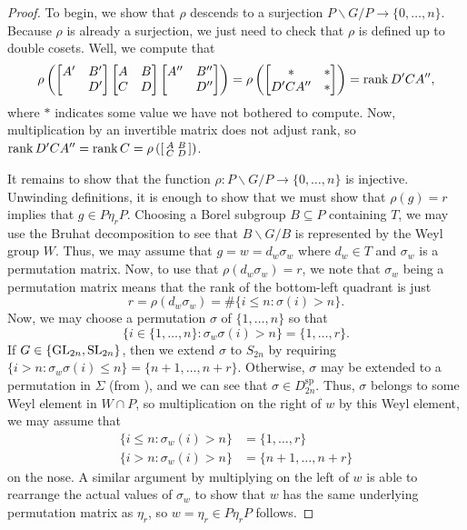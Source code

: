 \begin{proof}
    To begin, we show that $\rho$ descends to a surjection $P\backslash G/P\to\{0,\ldots,n\}$. Because $\rho$ is already a surjection, we just need to check that $\rho$ is defined up to double cosets. Well, we compute that
    \[\rho\left(\begin{bmatrix}
        A' & B' \\ & D'
    \end{bmatrix}\begin{bmatrix}
        A & B \\ C & D
    \end{bmatrix}\begin{bmatrix}
        A'' & B'' \\ & D''
    \end{bmatrix}\right)=\rho\left(\begin{bmatrix}
        * & * \\
        D'CA'' & *
    \end{bmatrix}\right)=\operatorname{rank}D'CA'',\]
    where $*$ indicates some value we have not bothered to compute. Now, multiplication by an invertible matrix does not adjust rank, so $\operatorname{rank}D'CA''=\operatorname{rank}C=\rho\left(\begin{bsmallmatrix}
        A & B \\ C & D
    \end{bsmallmatrix}\right)$.

    It remains to show that the function $\rho\colon P\backslash G/P\to\{0,
    \ldots,n\}$ is injective. Unwinding definitions, it is enough to show that we must show that $\rho(g)=r$ implies that $g\in P\eta_rP$. Choosing a Borel subgroup $B\subseteq P$ containing $T$, we may use the Bruhat decomposition to see that $B\backslash G/B$ is represented by the Weyl group $W$. Thus, we may assume that $g=w=d_w\sigma_w$ where $d_w\in T$ and $\sigma_w$ is a permutation matrix. Now, to use that $\rho(d_w\sigma_w)=r$, we note that $\sigma_w$ being a permutation matrix means that the rank of the bottom-left quadrant is just
    \[r=\rho(d_w\sigma_w)=\#\{i\le n:\sigma(i)>n\}.\]
    Now, we may choose a permutation $\sigma$ of $\{1,\ldots,n\}$ so that
    \[\{i\in\{1,\ldots,n\}:\sigma_w\sigma(i)>n\}=\{1,\ldots,r\}.\]
    If $G\in\{\mathrm{GL}_{2n},\mathrm{SL}_{2n}\}$, then we extend $\sigma$ to $S_{2n}$ by requiring $\{i>n:\sigma_w\sigma(i)\le n\}=\{n+1,\ldots,n+r\}$. Otherwise, $\sigma$ may be extended to a permutation in $\Sigma$ (from ), and we can see that $\sigma\in D_{2n}^{\mathrm{sp}}$. Thus, $\sigma$ belongs to some Weyl element in $W\cap P$, so multiplication on the right of $w$ by this Weyl element, we may assume that
    \begin{align*}
        \{i\le n:\sigma_w(i)>n\} &= \{1,\ldots,r\} \\
        \{i>n:\sigma_w(i)>n\} &= \{n+1,\ldots,n+r\}
    \end{align*}
    on the nose. A similar argument by multiplying on the left of $w$ is able to rearrange the actual values of $\sigma_w$ to show that $w$ has the same underlying permutation matrix as $\eta_r$, so $w=\eta_r\in P\eta_rP$ follows.
\end{proof}
